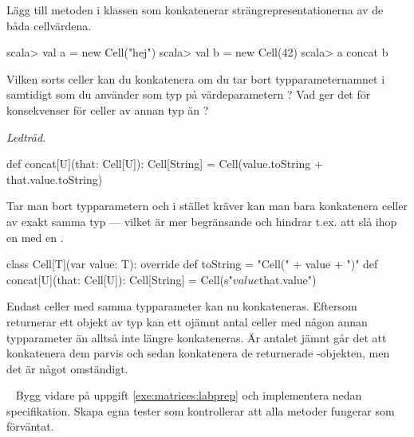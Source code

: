 \Subtask Lägg till metoden  i klassen  som konkatenerar strängrepresentationerna av de båda cellvärdena.

\begin{REPL}
scala> val a = new Cell("hej")
scala> val b = new Cell(42)
scala> a concat b
\end{REPL}

\Subtask Vilken sorts celler kan du konkatenera om du tar bort typparameternamnet  i  samtidigt som du använder  som typ på värdeparametern ? Vad ger det för konsekvenser för celler av annan typ än ?

\SOLUTION

\TaskSolved \what

\SubtaskSolved
\emph{Ledtråd.} 
\begin{Code}
  def concat[U](that: Cell[U]): Cell[String] = 
    Cell(value.toString + that.value.toString)
\end{Code}
Tar man bort typparametern  och i stället kräver  kan man bara konkatenera celler av exakt samma typ  --- vilket är mer begränsande och hindrar t.ex. att slå ihop en  med en .

\SubtaskSolved  \begin{Code}
class Cell[T](var value: T):
  override def toString = "Cell(" + value + ")"
  def concat[U](that: Cell[U]): Cell[String] = 
    Cell(s"$value${that.value}")
\end{Code}

\SubtaskSolved   Endast celler med samma typparameter kan nu konkateneras. Eftersom  returnerar ett objekt av typ  kan ett ojämnt antal celler med någon annan typparameter än  alltså inte längre konkateneras. Är antalet jämnt går det att konkatenera dem parvis och sedan konkatenera de returnerade -objekten, men det är något omständigt.

\QUESTEND


\QUESTBEGIN

\Task \what~ Bygg vidare på uppgift \ref{exe:matrices:labprep} och implementera nedan specifikation. Skapa egna tester som kontrollerar att alla metoder fungerar som förväntat.

